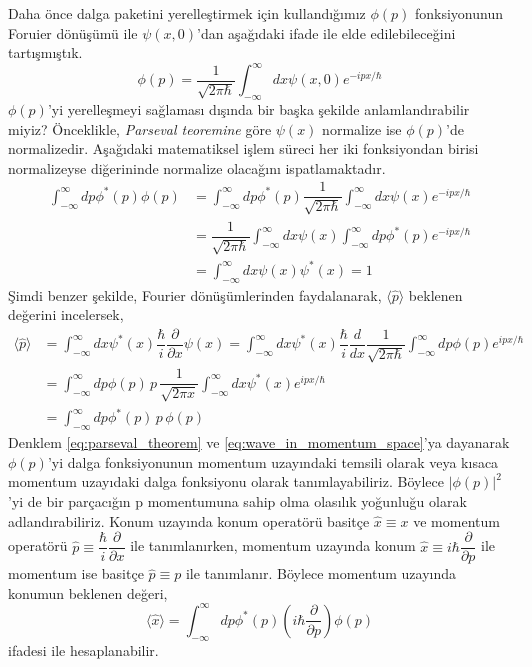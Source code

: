 \documentclass[00_kitap.tex]{subfiles}
\begin{document}
Daha önce dalga paketini yerelleştirmek için kullandığımız $\phi(p)$ fonksiyonunun Foruier dönüşümü ile $\psi(x,0)$'dan aşağıdaki ifade ile elde edilebileceğini tartışmıştık.
\begin{equation}
\phi \left( p\right) =\dfrac {1}{\sqrt {2\pi \hbar }}\int ^{\infty }_{-\infty }dx\psi \left( x,0\right) e^{-ipx/\hbar }
\end{equation}
$\phi(p)$'yi yerelleşmeyi sağlaması dışında bir başka şekilde anlamlandırabilir miyiz? Önceklikle, \emph{Parseval teoremine} göre $\psi(x)$ normalize ise $\phi(p)$'de normalizedir. Aşağıdaki matematiksel işlem süreci her iki fonksiyondan birisi normalizeyse diğerininde normalize olacağını ispatlamaktadır.
\begin{align}
\int ^{\infty }_{-\infty }dp\phi ^{\ast }\left( p\right) \phi \left( p\right) &=\int ^{\infty }_{-\infty }dp\phi ^{\ast }\left( p\right) \dfrac {1}{\sqrt {2\pi \hbar }}\int ^{\infty }_{-\infty }dx\psi \left( x\right) e^{-ipx/\hbar }\nonumber \\
&=\dfrac {1}{\sqrt {2\pi \hbar }}\int ^{\infty }_{-\infty }dx\psi \left( x\right) \int ^{\infty }_{-\infty }dp\phi^\ast \left( p\right) e^{-ipx/\hbar }\nonumber \\
&=\int ^{\infty }_{-\infty }dx\psi \left( x\right) \psi ^{\ast }\left( x\right) = 1
\label{eq:parseval_theorem}
\end{align}
Şimdi benzer şekilde, Fourier dönüşümlerinden faydalanarak, $\langle \hat p \rangle$ beklenen değerini incelersek,
\begin{align}
\langle \hat p\rangle &=\int ^{\infty }_{-\infty }dx\psi^\ast \left( x\right) \dfrac {\hbar }{i}\dfrac {\partial}{\partial x}\psi \left( x\right) =\int ^{\infty }_{-\infty }dx\psi^\ast \left( x\right) \dfrac {\hbar }{i}\dfrac {d}{dx}\dfrac {1}{\sqrt {2\pi \hbar }}\int ^{\infty }_{-\infty }dp\phi \left( p\right) e^{ipx/\hbar }\nonumber \\
&=\int ^{\infty }_{-\infty }dp\phi \left( p\right) \,p\, \dfrac {1}{\sqrt {2\pi x}}\int ^{\infty }_{-\infty }dx\psi ^{\ast }\left( x\right) e^{ipx/\hbar }\nonumber \\
&= \int ^{\infty }_{-\infty }dp\phi ^{\ast }(p)\,p\,\phi(p)
\label{eq:wave_in_momentum_space} 
\end{align}
Denklem \ref{eq:parseval_theorem} ve \ref{eq:wave_in_momentum_space}'ya dayanarak $\phi(p)$'yi dalga fonksiyonunun momentum uzayındaki temsili olarak veya kısaca momentum uzayıdaki dalga fonksiyonu olarak tanımlayabiliriz. Böylece $|\phi(p)|^2$'yi de bir parçacığın p momentumuna sahip olma olasılık yoğunluğu olarak adlandırabiliriz. Konum uzayında konum operatörü basitçe $\hat x \equiv x$ ve momentum operatörü $\hat p \equiv \dfrac{\hbar}{i}\dfrac{\partial}{\partial x}$ ile tanımlanırken, momentum uzayında konum $\hat x \equiv i \hbar\dfrac{\partial}{\partial p}$ ile momentum ise basitçe $\hat p \equiv p$ ile tanımlanır. Böylece momentum uzayında konumun beklenen değeri,
\begin{equation}
\langle \hat x \rangle =  \int ^{\infty }_{-\infty }dp\phi ^{\ast }(p)\left(i\hbar\dfrac{\partial}{\partial p}\right)\phi(p)
\end{equation}
ifadesi ile hesaplanabilir.


\BolumKaynakcaBitir
\end{document}
